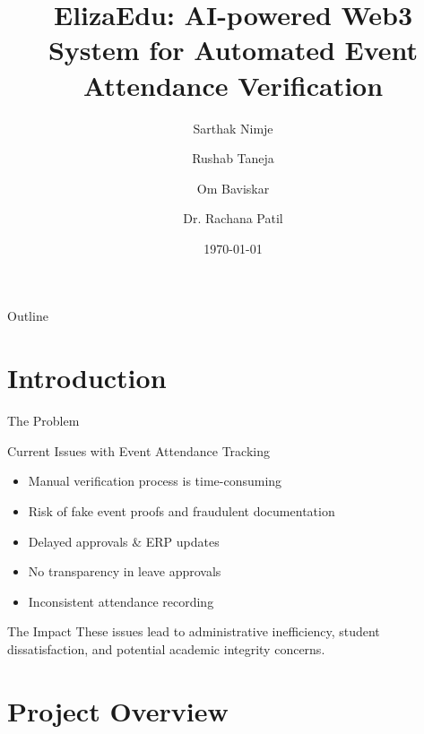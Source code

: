 \documentclass{beamer}
\title{ElizaEdu: AI-powered Web3 System for Automated Event Attendance Verification}
\author{Sarthak Nimje \and Rushab Taneja \and Om Baviskar \and Dr. Rachana Patil}
\institute{Pimpri Chinchwad College of Engineering, Pune}
\date{\today}
\begin{document}
\begin{frame}
\titlepage
\end{frame}

\begin{frame}{Outline}
\tableofcontents
\end{frame}

\section{Introduction}

\begin{frame}{The Problem}
\begin{block}{Current Issues with Event Attendance Tracking}
\begin{itemize}
    \item Manual verification process is time-consuming
    \item Risk of fake event proofs and fraudulent documentation
    \item Delayed approvals \& ERP updates
    \item No transparency in leave approvals
    \item Inconsistent attendance recording
\end{itemize}
\end{block}

\begin{alertblock}{The Impact}
These issues lead to administrative inefficiency, student dissatisfaction, and potential academic integrity concerns.
\end{alertblock}
\end{frame}

\section{Project Overview}
\end{document}
